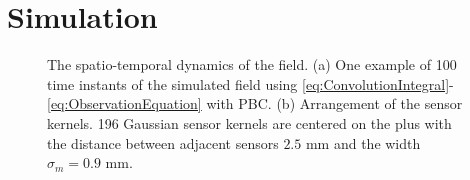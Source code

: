\documentclass[10pt,twocolumn,twoside]{IEEEtran}
\begin{document}
\section{Simulation}   
\begin{figure}[ht]
	\centering
	\caption{The spatio-temporal dynamics of the field. (a) One example of 100 time instants of the simulated field using \eqref{eq:ConvolutionIntegral}-\eqref{eq:ObservationEquation}   with PBC. (b) Arrangement of the sensor kernels. 196 Gaussian sensor kernels are centered on the plus with the distance between adjacent sensors $2.5$ mm and the width $\sigma_m=0.9$ mm.}
	\label{fig:SimulatedData}
\end{figure}
\end{document}

